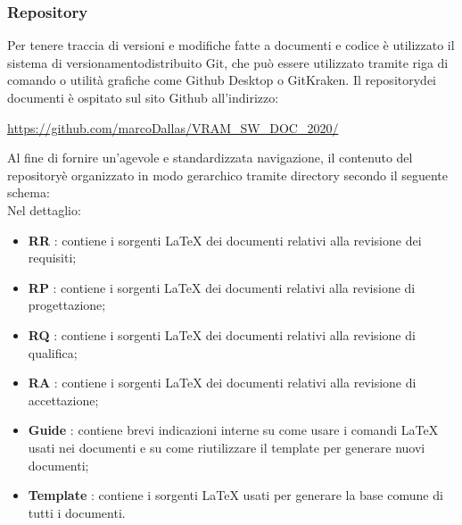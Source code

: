 	\subsubsection{Repository\glosp}
		Per tenere traccia di versioni e modifiche fatte a documenti e codice è utilizzato il sistema di versionamento\glosp distribuito Git, che può essere utilizzato tramite riga di comando o utilità grafiche come Github Desktop o GitKraken.
		Il repository\glosp dei documenti è ospitato sul sito Github all'indirizzo: 
		\begin{center}
			\url{https://github.com/marcoDallas/VRAM_SW_DOC_2020/}
		\end{center}
		Al fine di fornire un'agevole e standardizzata navigazione, il contenuto del repository\glosp è organizzato in modo gerarchico tramite directory secondo il seguente schema:
		\newline
		\mbox{}\\ %
		Nel dettaglio:
		\begin{itemize}
			\item \textbf{RR} : contiene i sorgenti \LaTeX \xspace dei documenti relativi alla revisione dei requisiti;
			\item \textbf{RP} : contiene i sorgenti \LaTeX \xspace dei documenti relativi alla revisione di progettazione;
			\item \textbf{RQ} : contiene i sorgenti \LaTeX \xspace dei documenti relativi alla revisione di qualifica;
			\item \textbf{RA} : contiene i sorgenti \LaTeX \xspace dei documenti relativi alla revisione di accettazione; 
			\item \textbf{Guide} : contiene brevi indicazioni interne su come usare i comandi \LaTeX \xspace usati nei documenti e su come riutilizzare il template per generare nuovi documenti;
			\item \textbf{Template} : contiene i sorgenti \LaTeX \xspace usati per generare la base comune di tutti i documenti.
		\end{itemize}
		
